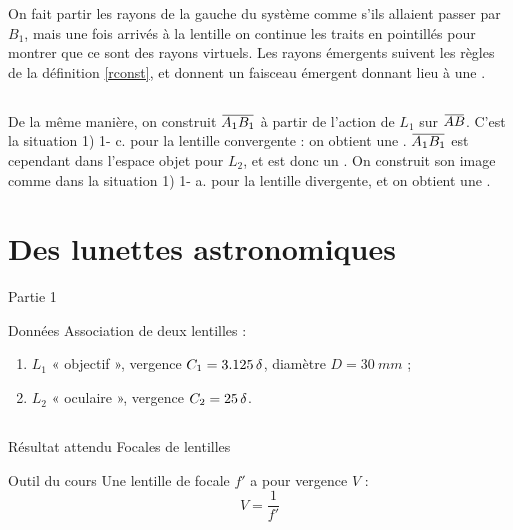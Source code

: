 \documentclass[10pt,a5paper,notitlepage]{book}
\begin{document}
On fait partir les rayons de la gauche du système comme s'ils allaient passer
par $B_1$, mais une fois arrivés à la lentille on continue les traits en
pointillés pour montrer que ce sont des rayons virtuels. Les rayons émergents
suivent les règles de la définition \ref{rconst}, et donnent un faisceau
émergent  donnant lieu à une .

\subsection{}
De la même manière, on construit $\ABa$ à partir de l'action de $L_1$ sur $\ABb$.
C'est la situation 1) 1- c. pour la lentille convergente : on obtient une
 . $\ABa$ est cependant dans l'espace
objet pour $L_2$, et est donc un  . On
construit son image comme dans la situation 1) 1- a. pour la lentille
divergente, et on obtient une .

\section{Des lunettes astronomiques}
\begin{center}
    \huge Partie 1
\end{center}

\pagebreak

\begin{NCdefi}{Données}
    Association de deux lentilles :
    \begin{enumerate}
        \item $L_1$ « objectif », vergence $C_1 = \SI{3.125}{\delta}$, diamètre $D
            = \SI{30}{mm}$ ;
        \item $L_2$ « oculaire », vergence $C_2 = \SI{25}{\delta}$.
    \end{enumerate}
\end{NCdefi}

\subsection{}

\begin{NCprop}{Résultat attendu}
    Focales de lentilles
\end{NCprop}

\begin{NCdemo}{Outil du cours}
    Une lentille de focale $f'$ a pour vergence $V$ :
    \[ V = \frac{1}{f'} \]
\end{NCdemo}
\end{document}

